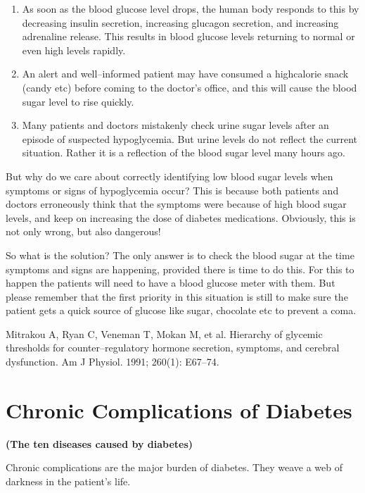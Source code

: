 \begin{enumerate}[•]
\itemsep=0pt
\item As soon as the blood glucose level drops, the human body responds to this by decreasing insulin secretion, increasing glucagon secretion, and increasing adrenaline release. This results in blood glucose levels returning to normal or even high levels rapidly.
\item An alert and well–informed patient may have consumed a high\break calorie snack (candy etc) before coming to the doctor’s office, and this will cause the blood sugar level to rise quickly.
\item Many patients and doctors mistakenly check urine sugar levels after an episode of suspected hypoglycemia. But urine levels do not reflect the current situation. Rather it is a reflection of the blood sugar level many hours ago.
\end{enumerate}

But why do we care about correctly identifying low blood sugar levels when symptoms or signs of hypoglycemia occur? This is because both patients and doctors erroneously think that the symptoms were because of high blood sugar levels, and keep on increasing the dose of diabetes medications. Obviously, this is not only wrong, but also dangerous!

So what is the solution? The only answer is to check the blood sugar at the time symptoms and signs are happening, provided there is time to do this. For this to happen the patients will need to have a blood glucose meter with them. But please remember that the first priority in this situation is still to make sure the patient gets a quick source of glucose like sugar, chocolate etc to prevent a coma.

\begin{thebibliography}{99}
 Mitrakou A, Ryan C, Veneman T, Mokan M, et al. Hierarchy of glycemic thresholds for counter–regulatory hormone secretion, symptoms, and cerebral dysfunction. Am J Physiol. 1991; 260(1): E67–74.
 \end{thebibliography}


\chapter{Chronic Complications of Diabetes}\label{chap11}

\centerline{\Large{\textbf{(The ten diseases caused by diabetes)}}}

\vskip 8pt
Chronic complications are the major burden of diabetes. They weave a web of darkness in the patient’s life.

